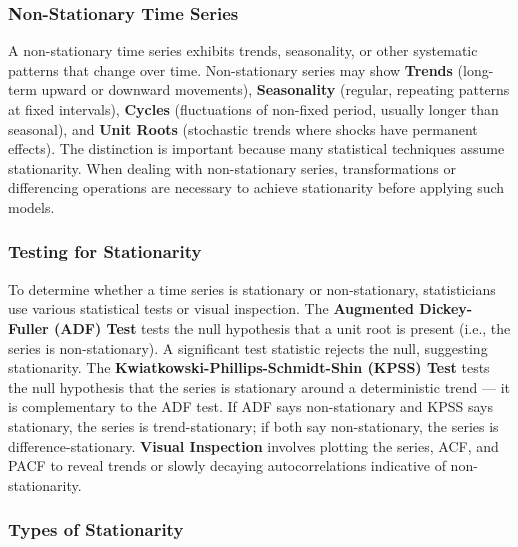 \documentclass[11pt,a4paper]{article}
\begin{document}
\subsubsection{Non-Stationary Time Series}

A non-stationary time series exhibits trends, seasonality, or other systematic patterns that change over time. Non-stationary series may show \textbf{Trends} (long-term upward or downward movements), \textbf{Seasonality} (regular, repeating patterns at fixed intervals), \textbf{Cycles} (fluctuations of non-fixed period, usually longer than seasonal), and \textbf{Unit Roots} (stochastic trends where shocks have permanent effects). The distinction is important because many statistical techniques assume stationarity. When dealing with non-stationary series, transformations or differencing operations are necessary to achieve stationarity before applying such models.

\subsubsection{Testing for Stationarity}

To determine whether a time series is stationary or non-stationary, statisticians use various statistical tests or visual inspection. The \textbf{Augmented Dickey-Fuller (ADF) Test} tests the null hypothesis that a unit root is present (i.e., the series is non-stationary). A significant test statistic rejects the null, suggesting stationarity. The \textbf{Kwiatkowski-Phillips-Schmidt-Shin (KPSS) Test} tests the null hypothesis that the series is stationary around a deterministic trend --- it is complementary to the ADF test. If ADF says non-stationary and KPSS says stationary, the series is trend-stationary; if both say non-stationary, the series is difference-stationary. \textbf{Visual Inspection} involves plotting the series, ACF, and PACF to reveal trends or slowly decaying autocorrelations indicative of non-stationarity.

\subsubsection{Types of Stationarity}
\end{document}
